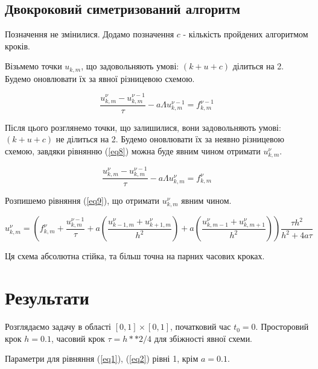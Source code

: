 \documentclass[a4paper,12pt]{article}
\begin{document}
\subsection{Двокроковий симетризований алгоритм}

Позначення не змінилися. Додамо позначення $c$ - кількість пройдених алгоритмом кроків.

Візьмемо точки $u_{k,m}$, що задовольняють умові: $(k+u+c)$ ділиться на 2. Будемо оновлювати їх за явної різницевою схемою.

\begin{equation} \label{eq8}
	\frac{u_{k,m}^{\nu} - u_{k,m}^{\nu -1}}{\tau} - a\Lambda u_{k,m}^{\nu-1} = f_{k,m}^{\nu-1}
\end{equation}

Після цього розглянемо точки, що залишилися, вони задовольняють умові: $(k+u+c)$ не ділиться на 2. Будемо оновлювати їх за неявно різницевою схемою, завдяки рівнянню (\ref{eq8}) можна буде явним чином отримати $u_{k,m}^{\nu}$.

\begin{equation} \label{eq9}
		\frac{u_{k,m}^{\nu} - u_{k,m}^{\nu-1}}{\tau} - a\Lambda u_{k,m}^{\nu} = f_{k,m}^{\nu}
\end{equation}

Розпишемо рівняння (\ref{eq9}), що отримати $u_{k,m}^{\nu}$ явним чином.

\begin{displaymath} 
	u_{k,m}^{\nu} = \left( f_{k,m}^{\nu} + \frac{u_{k,m}^{\nu -1}}{\tau} + a \left( \frac{u_{k-1,m}^{\nu} + u_{k+1,m}^{\nu}}{h^2} \right) + a \left( \frac{u_{k,m-1}^{\nu} + u_{k,m+1}^{\nu}}{h^2} \right) \right) \frac{\tau h^2}{h^2 + 4 a \tau}
\end{displaymath}

Ця схема абсолютна стійка, та більш точна на парних часових кроках.

\section{Результати}

Розглядаємо задачу в області $[0,1] \times [0,1]$, початковий час $t_0 = 0$. Просторовий крок $h = 0.1$, часовий крок $\tau = h**2/4$ для збіжності явної схеми. 

Параметри для рівняння (\ref{eq1}), (\ref{eq2}) рівні 1, крім $a= 0.1$.
\end{document}
